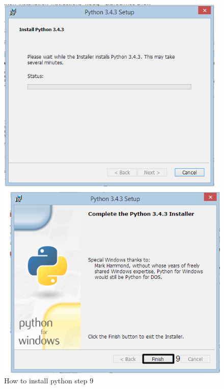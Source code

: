 \begin{enumerate}
\begin{figure}[H]
	\includegraphics{./manual/images/python-installation-instructions-6.png}
	\caption{How to install python step 9}
\end{figure}
\end{enumerate}

